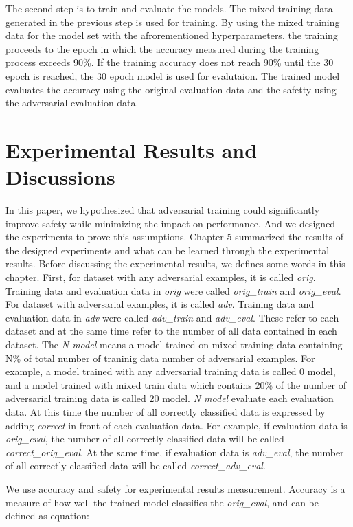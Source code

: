 \documentclass[journal,article,submit,moreauthors,pdftex]{Definitions/mdpi}
\begin{document}
The second step is to train and evaluate the models.
The mixed training data generated in the previous step is used for training.
By using the mixed training data for the model set with the afrorementioned hyperparameters, the training proceeds to the epoch in which the accuracy measured during the training process exceeds 90\%.
If the training accuracy does not reach 90\% until the 30 epoch is reached, the 30 epoch model is used for evalutaion.
The trained model evaluates the accuracy using the original evaluation data and the safetty using the adversarial evaluation data.

\section{Experimental Results and Discussions}

In this paper, we hypothesized that adversarial training could significantly improve safety while minimizing the impact on performance, And we designed the experiments to prove this assumptions.
Chapter 5 summarized the results of the designed experiments and what can be learned through the experimental results.
Before discussing the experimental results, we defines some words in this chapter.
First, for dataset with any adversarial examples, it is called {\it orig}. Training data and evaluation data in {\it orig} were called {\it orig\_train} and {\it orig\_eval}.
For dataset with adversarial examples, it is called {\it adv}. Training data and evaluation data in {\it adv} were called {\it adv\_train} and {\it adv\_eval}.
These refer to each dataset and at the same time refer to the number of all data contained in each dataset.
The {\it N model} means a model trained on mixed training data containing N\% of total number of traninig data number of adversarial examples.
For example, a model trained with any adversarial training data is called 0 model, and a model trained with mixed train data which contains 20\% of the number of adversarial training data is called 20 model.
{\it N model} evaluate each evaluation data. At this time the number of all correctly classified data is expressed by adding {\it correct} in front of each evaluation data.
For example, if evaluation data is {\it orig\_eval}, the number of all correctly classified data will be called {\it correct\_orig\_eval}.
At the same time, if evaluation data is {\it adv\_eval}, the number of all correctly classified data will be called {\it correct\_adv\_eval}.

We use accuracy and safety for experimental results measurement. Accuracy is a measure of how well the trained model classifies the {\it orig\_eval}, and can be defined as equation:
\end{document}
